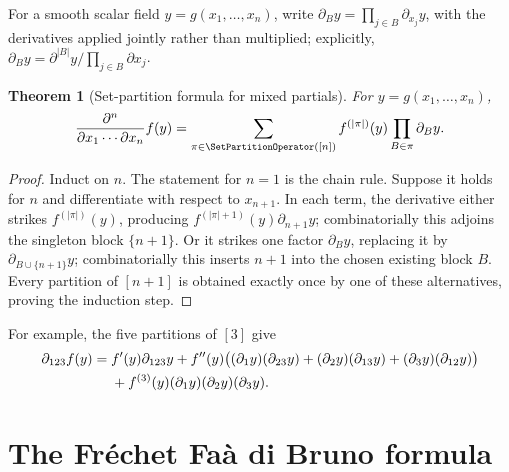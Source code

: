 \documentclass[11pt,a4paper,oneside,openany]{book}
\newtheorem{theorem}{Theorem}[chapter]
\theoremstyle{definition}
\theoremstyle{remark}
\begin{document}
For a smooth scalar field \(y=g(x_1,\ldots,x_n)\), write
\(\partial_B y=\prod_{j\in B}\partial_{x_j}y\), with the derivatives applied
jointly rather than multiplied; explicitly,
\(\partial_B y=\partial^{|B|}y/\prod_{j\in B}\partial x_j\).

\begin{theorem}[Set-partition formula for mixed partials]
\label{thm:ext-faa-mixed}
For \(y=g(x_1,\ldots,x_n)\),
\begin{equation}\label{eq:ext-faa-mixed}
 \frac{\partial^n}{\partial x_1\cdots\partial x_n}f(y)
 =\sum_{\pi\in\SetPartitionOperator([n])}f^{(|\pi|)}(y)
   \prod_{B\in\pi}\partial_B y.
\end{equation}
\end{theorem}
\begin{proof}
Induct on \(n\).  The statement for \(n=1\) is the chain rule.  Suppose it
holds for \(n\) and differentiate with respect to \(x_{n+1}\).  In each term,
the derivative either strikes \(f^{(|\pi|)}(y)\), producing
\(f^{(|\pi|+1)}(y)\partial_{n+1}y\); combinatorially this adjoins the singleton
block \(\{n+1\}\).  Or it strikes one factor \(\partial_B y\), replacing it by
\(\partial_{B\cup\{n+1\}}y\); combinatorially this inserts \(n+1\) into the
chosen existing block \(B\).  Every partition of \([n+1]\) is obtained exactly
once by one of these alternatives, proving the induction step.
\end{proof}

For example, the five partitions of \([3]\) give
\begin{align}
 \partial_{123}f(y)={}&f'(y)\partial_{123}y
 +f''(y)\bigl((\partial_1y)(\partial_{23}y)
              +(\partial_2y)(\partial_{13}y)
              +(\partial_3y)(\partial_{12}y)\bigr)\notag\\
 &+f^{(3)}(y)(\partial_1y)(\partial_2y)(\partial_3y).
 \label{eq:ext-faa-mixed-three}
\end{align}

\section{The Fr\'echet Fa\`a di Bruno formula}
\end{document}

